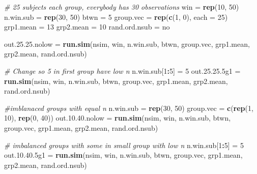 \documentclass[
]{book}
\newenvironment{Shaded}{\begin{snugshade}}{\end{snugshade}}
\newcommand{\CommentTok}[1]{\textcolor[rgb]{0.56,0.35,0.01}{\textit{#1}}}
\newcommand{\DataTypeTok}[1]{\textcolor[rgb]{0.13,0.29,0.53}{#1}}
\newcommand{\DecValTok}[1]{\textcolor[rgb]{0.00,0.00,0.81}{#1}}
\newcommand{\FloatTok}[1]{\textcolor[rgb]{0.00,0.00,0.81}{#1}}
\newcommand{\KeywordTok}[1]{\textcolor[rgb]{0.13,0.29,0.53}{\textbf{#1}}}
\newcommand{\NormalTok}[1]{#1}
\newcommand{\OperatorTok}[1]{\textcolor[rgb]{0.81,0.36,0.00}{\textbf{#1}}}
\newcommand{\StringTok}[1]{\textcolor[rgb]{0.31,0.60,0.02}{#1}}
\begin{document}
\begin{Shaded}
\begin{Highlighting}[]
\CommentTok{\# 25 subjects each group, everybody has 30 observations}
\NormalTok{win =}\StringTok{ }\KeywordTok{rep}\NormalTok{(}\DecValTok{10}\NormalTok{, }\DecValTok{50}\NormalTok{)}
\NormalTok{n.win.sub =}\StringTok{ }\KeywordTok{rep}\NormalTok{(}\DecValTok{30}\NormalTok{, }\DecValTok{50}\NormalTok{)}
\NormalTok{btwn =}\StringTok{ }\DecValTok{5}
\NormalTok{group.vec =}\StringTok{ }\KeywordTok{rep}\NormalTok{(}\KeywordTok{c}\NormalTok{(}\DecValTok{1}\NormalTok{, }\DecValTok{0}\NormalTok{), }\DataTypeTok{each =} \DecValTok{25}\NormalTok{)}
\NormalTok{grp1.mean =}\StringTok{ }\DecValTok{13}
\NormalTok{grp2.mean =}\StringTok{ }\DecValTok{10}
\NormalTok{rand.ord.nsub =}\StringTok{ \textquotesingle{}no\textquotesingle{}}

\NormalTok{out.}\DecValTok{25}\NormalTok{.}\FloatTok{25.}\NormalTok{nolow =}\StringTok{ }\KeywordTok{run.sim}\NormalTok{(nsim, win, n.win.sub, btwn,}
\NormalTok{                          group.vec, grp1.mean, }
\NormalTok{                          grp2.mean, rand.ord.nsub)}

\CommentTok{\# Change so 5 in first group have low n}
\NormalTok{n.win.sub[}\DecValTok{1}\OperatorTok{:}\DecValTok{5}\NormalTok{] =}\StringTok{ }\DecValTok{5}
\NormalTok{out.}\DecValTok{25}\NormalTok{.}\FloatTok{25.5}\NormalTok{g1 =}\StringTok{ }\KeywordTok{run.sim}\NormalTok{(nsim, win, n.win.sub, btwn,}
\NormalTok{                        group.vec, grp1.mean, }
\NormalTok{                        grp2.mean, rand.ord.nsub)}

\CommentTok{\#imblanaced groups with equal n}
\NormalTok{n.win.sub =}\StringTok{ }\KeywordTok{rep}\NormalTok{(}\DecValTok{30}\NormalTok{, }\DecValTok{50}\NormalTok{)}
\NormalTok{group.vec =}\StringTok{ }\KeywordTok{c}\NormalTok{(}\KeywordTok{rep}\NormalTok{(}\DecValTok{1}\NormalTok{, }\DecValTok{10}\NormalTok{), }\KeywordTok{rep}\NormalTok{(}\DecValTok{0}\NormalTok{, }\DecValTok{40}\NormalTok{))}
\NormalTok{out.}\DecValTok{10}\NormalTok{.}\FloatTok{40.}\NormalTok{nolow =}\StringTok{ }\KeywordTok{run.sim}\NormalTok{(nsim, win, n.win.sub, btwn,}
\NormalTok{                          group.vec, grp1.mean, grp2.mean,}
\NormalTok{                          rand.ord.nsub)}

\CommentTok{\# imbalanced groups with some in small group with low n}
\NormalTok{n.win.sub[}\DecValTok{1}\OperatorTok{:}\DecValTok{5}\NormalTok{] =}\StringTok{ }\DecValTok{5}
\NormalTok{out.}\DecValTok{10}\NormalTok{.}\FloatTok{40.5}\NormalTok{g1 =}\StringTok{ }\KeywordTok{run.sim}\NormalTok{(nsim, win, n.win.sub, btwn, }
\NormalTok{                        group.vec, grp1.mean, grp2.mean,}
\NormalTok{                        rand.ord.nsub)}
\end{Highlighting}
\end{Shaded}
\end{document}
